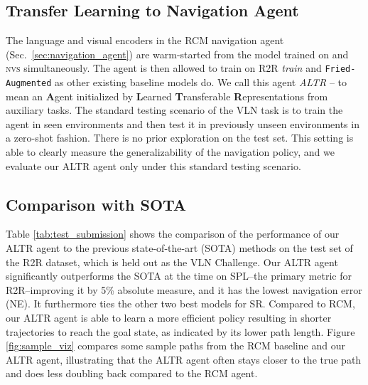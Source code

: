 \documentclass[10pt,twocolumn,letterpaper]{article}
\newcommand{\friedaug}{\texttt{Fried-Augmented}}
\newcommand{\tasknvs}{\textsc{nvs}}
\begin{document}
\subsection{Transfer Learning to Navigation Agent}

The language and visual encoders in the RCM navigation agent (Sec.~\ref{sec:navigation_agent}) are warm-started from the model trained on {\taskcma} and {\tasknvs} simultaneously. The agent is then allowed to train on R2R \textit{train} and {\friedaug} as other existing baseline models do. We call this agent \textit{ALTR} -- to mean an \textbf{A}gent initialized by \textbf{L}earned \textbf{T}ransferable \textbf{R}epresentations from auxiliary tasks. The standard testing scenario of the VLN task is to train the agent in seen environments and then test it in previously unseen environments in a zero-shot fashion. There is no prior exploration on the test set. This setting is able to clearly measure the generalizability of the navigation policy, and we evaluate our ALTR agent only under this standard testing scenario.


\subsection{Comparison with SOTA}
Table \ref{tab:test_submission} shows the comparison of the performance of our ALTR agent to the previous state-of-the-art (SOTA) methods on the test set of the R2R dataset, which is held out as the VLN Challenge. Our ALTR agent significantly outperforms the SOTA at the time on SPL--the primary metric for R2R--improving it by 5\% absolute measure, and it has the lowest navigation error (NE). It furthermore ties the other two best models for SR. Compared to RCM, our ALTR agent is able to learn a more efficient policy resulting in shorter trajectories to reach the goal state, as indicated by its lower path length.  Figure \ref{fig:sample_viz} compares some sample paths from the RCM baseline and our ALTR agent, illustrating that the ALTR agent often stays closer to the true path and does less doubling back compared to the RCM agent. 
\end{document}
